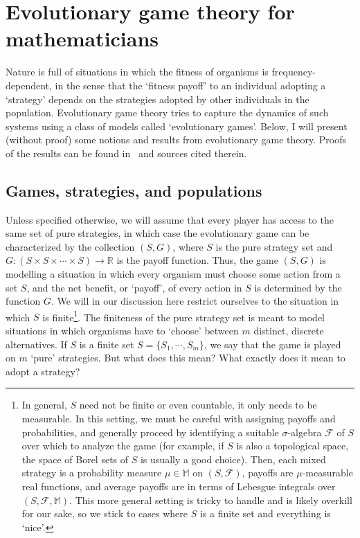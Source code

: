 \chapter{Evolutionary game theory for mathematicians}\label{background_EGT}
Nature is full of situations in which the fitness of organisms is frequency-dependent, in the sense that the `fitness payoff' to an individual adopting a `strategy' depends on the strategies adopted by other individuals in the population. Evolutionary game theory tries to capture the dynamics of such systems using a class of models called `evolutionary games'. Below, I will present (without proof) some notions and results from evolutionary game theory. Proofs of the results can be found in~\cite{broom_game-theoretical_2022} and sources cited therein.

\section{Games, strategies, and populations}
Unless specified otherwise, we will assume that every player has access to the same set of pure strategies, in which case the evolutionary game can be characterized by the collection $(S,G)$, where $S$ is the pure strategy set and $G:(S\times S \times \cdots \times S) \to \mathbb{R}$ is the payoff function.
Thus, the game $(S,G)$ is modelling a situation in which every organism must choose some action from a set $S$, and the net benefit, or `payoff', of every action in $S$ is determined by the function $G$. We will in our discussion here restrict ourselves to the situation in which $S$ is finite\footnote{In general, $S$ need not be finite or even countable, it only needs to be measurable. In this setting, we must be careful with assigning payoffs and probabilities, and generally proceed by identifying a suitable $\sigma$-algebra $\mathcal{F}$ of $S$ over which to analyze the game (for example, if $S$ is also a topological space, the space of Borel sets of $S$ is usually a good choice). Then, each mixed strategy is a probability measure $\mu \in \mathbb{M}$ on $(S,\mathcal{F})$, payoffs are $\mu$-measurable real functions, and average payoffs are in terms of Lebesgue integrals over $(S,\mathcal{F},\mathbb{M})$. This more general setting is tricky to handle and is likely overkill for our sake, so we stick to cases where $S$ is a finite set and everything is `nice'.}. The finiteness of the pure strategy set is meant to model situations in which organisms have to `choose' between $m$ distinct, discrete alternatives.
If $S$ is a finite set $S = \{S_1,\cdots,S_m\}$, we say that the game is played on $m$ `pure' strategies. But what does this mean? What exactly does it mean to adopt a strategy?

